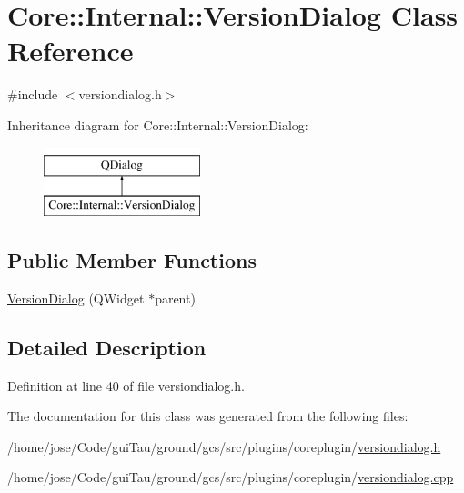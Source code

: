 \hypertarget{class_core_1_1_internal_1_1_version_dialog}{\section{Core\-:\-:Internal\-:\-:Version\-Dialog Class Reference}
\label{class_core_1_1_internal_1_1_version_dialog}
}


{\ttfamily \#include $<$versiondialog.\-h$>$}

Inheritance diagram for Core\-:\-:Internal\-:\-:Version\-Dialog\-:\begin{figure}[H]
\begin{center}
\leavevmode
\includegraphics[height=2.000000cm]{class_core_1_1_internal_1_1_version_dialog}
\end{center}
\end{figure}
\subsection*{Public Member Functions}
\begin{DoxyCompactItemize}
\item 
\hyperlink{group___core_plugin_ga3a3324c5e62d8d766d8ef28592cb11fa}{Version\-Dialog} (Q\-Widget $\ast$parent)
\end{DoxyCompactItemize}


\subsection{Detailed Description}


Definition at line 40 of file versiondialog.\-h.



The documentation for this class was generated from the following files\-:\begin{DoxyCompactItemize}
\item 
/home/jose/\-Code/gui\-Tau/ground/gcs/src/plugins/coreplugin/\hyperlink{versiondialog_8h}{versiondialog.\-h}\item 
/home/jose/\-Code/gui\-Tau/ground/gcs/src/plugins/coreplugin/\hyperlink{versiondialog_8cpp}{versiondialog.\-cpp}\end{DoxyCompactItemize}
